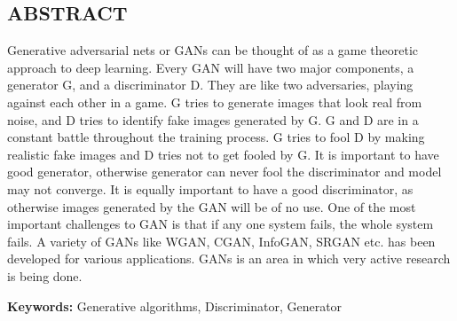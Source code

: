 \begin{center}
    \section*{ABSTRACT}
    \justify
    \begin{doublespace}
    Generative adversarial nets or GANs can be thought of as a game theoretic 
    approach to deep learning. Every GAN will have two major components, 
    a generator G, and a discriminator D. They are like two adversaries, playing 
    against each other in a game. G tries to generate images that look real from 
    noise, and D tries to identify fake images generated by G. G and D are in a 
    constant battle throughout the training process. G tries to fool D by making 
    realistic fake images and D tries not to get fooled by G. It is important to 
    have good generator, otherwise generator can never fool the discriminator 
    and model may not converge. It is equally important to have a good 
    discriminator, as otherwise images generated by the GAN will be of no use. 
    One of the most important challenges to GAN is that if any one system fails, 
    the whole system fails. A variety of GANs like WGAN, CGAN, InfoGAN, SRGAN 
    etc. has been developed for various applications. GANs is an area in which 
    very active research is being done.
    
    \noindent\textbf{Keywords:} Generative algorithms, Discriminator, Generator
    \end{doublespace}
\end{center}
